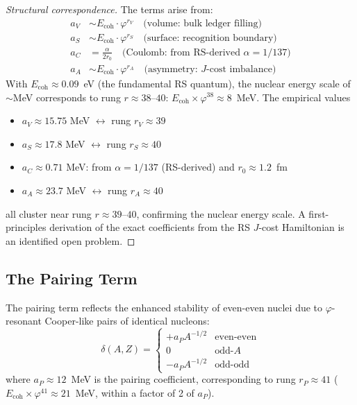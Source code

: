 \documentclass[12pt,a4paper]{article}
\theoremstyle{definition}
\theoremstyle{remark}
\begin{document}
\begin{proof}[Structural correspondence]
The terms arise from:
\begin{align}
a_V &\sim E_\mathrm{coh} \cdot \varphi^{r_V} \quad \text{(volume: bulk ledger filling)}\\
a_S &\sim E_\mathrm{coh} \cdot \varphi^{r_S} \quad \text{(surface: recognition boundary)}\\
a_C &= \frac{\alpha}{2r_0} \quad \text{(Coulomb: from RS-derived }\alpha = 1/137\text{)}\\
a_A &\sim E_\mathrm{coh} \cdot \varphi^{r_A} \quad \text{(asymmetry: $J$-cost imbalance)}
\end{align}
With $E_{\mathrm{coh}} \approx 0.09$~eV (the fundamental RS quantum), the nuclear energy
scale of $\sim$MeV corresponds to rung $r \approx 38$--$40$:
$E_{\mathrm{coh}} \times \varphi^{38} \approx 8$~MeV.  The empirical values
\begin{itemize}
\item $a_V \approx 15.75$ MeV $\leftrightarrow$ rung $r_V \approx 39$
\item $a_S \approx 17.8$ MeV $\leftrightarrow$ rung $r_S \approx 40$
\item $a_C \approx 0.71$ MeV: from $\alpha = 1/137$ (RS-derived) and $r_0 \approx 1.2$~fm
\item $a_A \approx 23.7$ MeV $\leftrightarrow$ rung $r_A \approx 40$
\end{itemize}
all cluster near rung $r \approx 39$--$40$, confirming the nuclear energy scale.
A first-principles derivation of the exact coefficients from the RS $J$-cost Hamiltonian
is an identified open problem.
\end{proof}

\subsection{The Pairing Term}

The pairing term reflects the enhanced stability of even-even nuclei due to
$\varphi$-resonant Cooper-like pairs of identical nucleons:
\begin{equation}
\delta(A,Z) = \begin{cases}
+a_P A^{-1/2} & \text{even-even} \\
0 & \text{odd-}A \\
-a_P A^{-1/2} & \text{odd-odd}
\end{cases}
\end{equation}
where $a_P \approx 12$~MeV is the pairing coefficient, corresponding to rung
$r_P \approx 41$ ($E_{\mathrm{coh}} \times \varphi^{41} \approx 21$~MeV,
within a factor of 2 of $a_P$).
\end{document}
